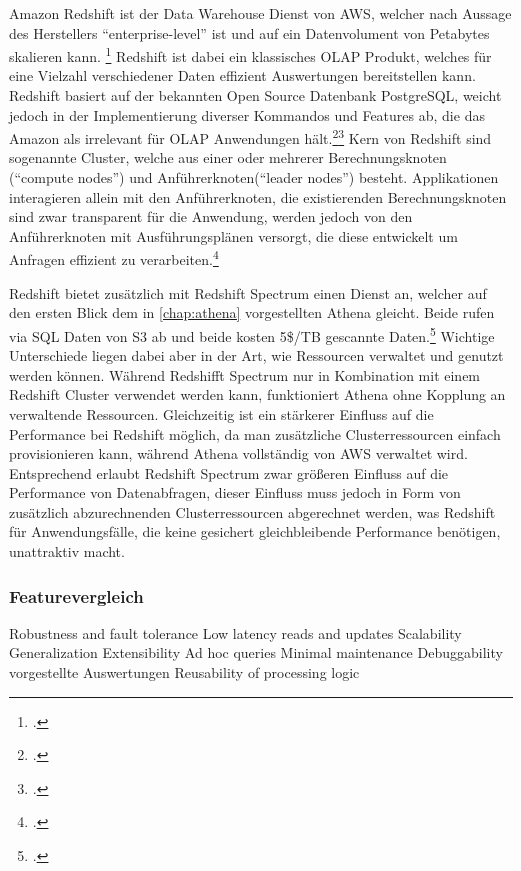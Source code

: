 Amazon Redshift ist der Data Warehouse Dienst von \ac{AWS}, welcher nach Aussage des Herstellers \enquote{enterprise-level} ist und auf ein Datenvolument von Petabytes skalieren kann. \footcite[Vgl.][1]{AmazonWebServicesInc..o.J.g} Redshift ist dabei ein klassisches \ac{OLAP} Produkt, welches für eine Vielzahl verschiedener Daten effizient Auswertungen bereitstellen kann. Redshift basiert auf der bekannten Open Source Datenbank PostgreSQL, weicht jedoch in der Implementierung diverser Kommandos und Features ab, die das Amazon als irrelevant für \ac{OLAP} Anwendungen hält.\footcite[Vgl.][4]{AmazonWebServicesInc..o.J.g}\nzitat\footcite[Vgl.][428\psqq]{AmazonWebServicesInc..o.J.g} Kern von Redshift sind sogenannte Cluster, welche aus einer oder mehrerer Berechnungsknoten (\enquote{compute nodes}) und Anführerknoten(\enquote{leader nodes}) besteht. Applikationen interagieren allein mit den Anführerknoten, die existierenden Berechnungsknoten sind zwar transparent für die Anwendung, werden jedoch von den Anführerknoten mit Ausführungsplänen versorgt, die diese entwickelt um Anfragen effizient zu verarbeiten.\footcite[Vgl.][4]{AmazonWebServicesInc..o.J.g}

Redshift bietet zusätzlich mit Redshift Spectrum einen Dienst an, welcher auf den ersten Blick dem in \autoref{chap:athena} vorgestellten Athena gleicht. Beide rufen via \ac{SQL} Daten von \ac{S3} ab und beide kosten 5\$/TB gescannte Daten.\footcite[Vgl. auch im Folgenden][]{Smallcombe.2020} Wichtige Unterschiede liegen dabei aber in der Art, wie Ressourcen verwaltet und genutzt werden können. Während Redshifft Spectrum nur in Kombination mit einem Redshift Cluster verwendet werden kann, funktioniert Athena ohne Kopplung an verwaltende Ressourcen. Gleichzeitig ist ein stärkerer Einfluss auf die Performance bei Redshift möglich, da man zusätzliche Clusterressourcen einfach provisionieren kann, während Athena vollständig von \ac{AWS} verwaltet wird. Entsprechend erlaubt Redshift Spectrum zwar größeren Einfluss auf die Performance von Datenabfragen, dieser Einfluss muss jedoch in Form von zusätzlich abzurechnenden Clusterressourcen abgerechnet werden, was Redshift für Anwendungsfälle, die keine gesichert gleichbleibende Performance benötigen, unattraktiv macht.


\subsubsection{Featurevergleich} 
Robustness and fault tolerance
Low latency reads and updates
Scalability
Generalization
Extensibility
Ad hoc queries
Minimal maintenance
Debuggability
vorgestellte Auswertungen 
Reusability of processing logic

